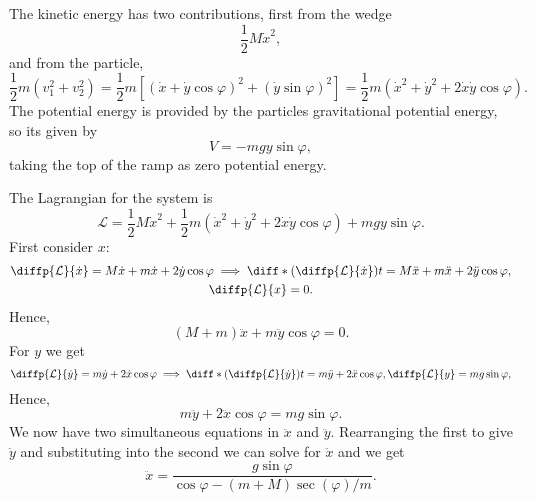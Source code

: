 \documentclass[fleqn]{NotesClass}
\newcommand*{\lagrangian}{\mathcal{L}}
\begin{document}
    The kinetic energy has two contributions, first from the wedge
    \begin{equation}
        \frac{1}{2}M\dot{x}^2,
    \end{equation}
    and from the particle,
    \begin{equation}
        \frac{1}{2}m(v_1^2 + v_2^2) = \frac{1}{2}m[(\dot{x} + \dot{y}\cos\varphi)^2 + (\dot{y}\sin\varphi)^2] = \frac{1}{2}m(\dot{x}^2 + \dot{y}^2 + 2\dot{x}\dot{y}\cos\varphi).
    \end{equation}
    The potential energy is provided by the particles gravitational potential energy, so its given by
    \begin{equation}
        V = -mgy\sin\varphi,
    \end{equation}
    taking the top of the ramp as zero potential energy.
    
    The Lagrangian for the system is
    \begin{equation}
        \lagrangian = \frac{1}{2}M\dot{x}^2 + \frac{1}{2}m(\dot{x}^2 + \dot{y}^2 + 2\dot{x}\dot{y}\cos\varphi) + mgy\sin\varphi.
    \end{equation}
    First consider \(x\):
    \begin{gather}
        \diffp{\lagrangian}{\dot{x}} = M\dot{x} + m\dot{x} + 2\dot{y}\cos\varphi \implies \diff*{\left( \diffp{\lagrangian}{\dot{x}} \right)}{t} = M\ddot{x} + m\ddot{x} + 2\ddot{y}\cos\varphi,\\
        \diffp{\lagrangian}{x} = 0.
    \end{gather}
    Hence,
    \begin{equation}
        (M + m)\ddot{x} +m\ddot{y}\cos\varphi = 0.
    \end{equation}
    For \(y\) we get
    \begin{equation}
        \diffp{\lagrangian}{\dot{y}} = m\dot{y} + 2\dot{x}\cos\varphi \implies \diff*{\left( \diffp{\lagrangian}{\dot{y}} \right)}{t} = m\ddot{y} + 2\ddot{x}\cos\varphi,\\
        \diffp{\lagrangian}{y} = mg\sin\varphi,
    \end{equation}
    Hence,
    \begin{equation}
        m\ddot{y} + 2\ddot{x}\cos\varphi = mg\sin\varphi.
    \end{equation}
    We now have two simultaneous equations in \(\ddot{x}\) and \(\ddot{y}\).
    Rearranging the first to give \(\ddot{y}\) and substituting into the second we can solve for \(\ddot{x}\) and we get
    \begin{equation}
        \ddot{x} = \frac{g\sin\varphi}{\cos\varphi - (m + M)\sec(\varphi)/m}.
    \end{equation}
    
\end{document}
